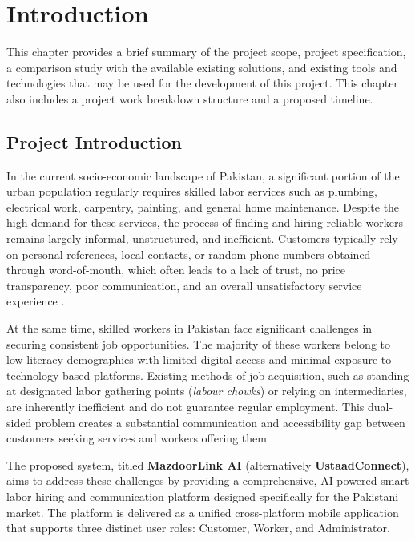\documentclass[12pt,a4paper]{report}
\begin{document}
\chapter{Introduction}

This chapter provides a brief summary of the project scope, project specification, a comparison study with the available existing solutions, and existing tools and technologies that may be used for the development of this project. This chapter also includes a project work breakdown structure and a proposed timeline.

\section{Project Introduction}

In the current socio-economic landscape of Pakistan, a significant portion of the urban population regularly requires skilled labor services such as plumbing, electrical work, carpentry, painting, and general home maintenance. Despite the high demand for these services, the process of finding and hiring reliable workers remains largely informal, unstructured, and inefficient. Customers typically rely on personal references, local contacts, or random phone numbers obtained through word-of-mouth, which often leads to a lack of trust, no price transparency, poor communication, and an overall unsatisfactory service experience \cite{ilo}.

At the same time, skilled workers in Pakistan face significant challenges in securing consistent job opportunities. The majority of these workers belong to low-literacy demographics with limited digital access and minimal exposure to technology-based platforms. Existing methods of job acquisition, such as standing at designated labor gathering points (\textit{labour chowks}) or relying on intermediaries, are inherently inefficient and do not guarantee regular employment. This dual-sided problem creates a substantial communication and accessibility gap between customers seeking services and workers offering them \cite{pbs}.

The proposed system, titled \textbf{MazdoorLink AI} (alternatively \textbf{UstaadConnect}), aims to address these challenges by providing a comprehensive, AI-powered smart labor hiring and communication platform designed specifically for the Pakistani market. The platform is delivered as a unified cross-platform mobile application that supports three distinct user roles: Customer, Worker, and Administrator.
\end{document}
